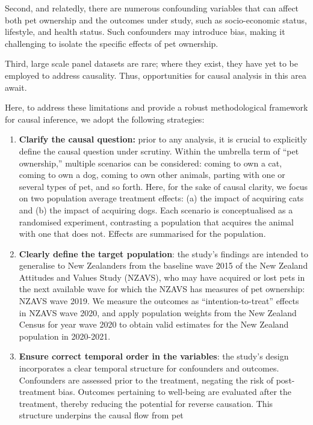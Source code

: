 \documentclass[
  singlecolumn,
  9pt]{article}
\begin{document}
Second, and relatedly, there are numerous confounding variables that can
affect both pet ownership and the outcomes under study, such as
socio-economic status, lifestyle, and health status. Such confounders
may introduce bias, making it challenging to isolate the specific
effects of pet ownership.

Third, large scale panel datasets are rare; where they exist, they have
yet to be employed to address causality. Thus, opportunities for causal
analysis in this area await.

Here, to address these limitations and provide a robust methodological
framework for causal inference, we adopt the following strategies:

\begin{enumerate}
\def\labelenumi{\arabic{enumi}.}
\item
  \textbf{Clarify the causal question:} prior to any analysis, it is
  crucial to explicitly define the causal question under scrutiny.
  Within the umbrella term of ``pet ownership,'' multiple scenarios can
  be considered: coming to own a cat, coming to own a dog, coming to own
  other animals, parting with one or several types of pet, and so forth.
  Here, for the sake of causal clarity, we focus on two population
  average treatment effects: (a) the impact of acquiring cats and (b)
  the impact of acquiring dogs. Each scenario is conceptualised as a
  randomised experiment, contrasting a population that acquires the
  animal with one that does not. Effects are summarised for the
  population.
\item
  \textbf{Clearly define the target population}: the study's findings
  are intended to generalise to New Zealanders from the baseline wave
  2015 of the New Zealand Attitudes and Values Study (NZAVS), who may
  have acquired or lost pets in the next available wave for which the
  NZAVS has measures of pet ownership: NZAVS wave 2019. We measure the
  outcomes as ``intention-to-treat'' effects in NZAVS wave 2020, and
  apply population weights from the New Zealand Census for year wave
  2020 to obtain valid estimates for the New Zealand population in
  2020-2021.
\item
  \textbf{Ensure correct temporal order in the variables}: the study's
  design incorporates a clear temporal structure for confounders and
  outcomes. Confounders are assessed prior to the treatment, negating
  the risk of post-treatment bias. Outcomes pertaining to well-being are
  evaluated after the treatment, thereby reducing the potential for
  reverse causation. This structure underpins the causal flow from pet

\end{enumerate}
\end{document}
